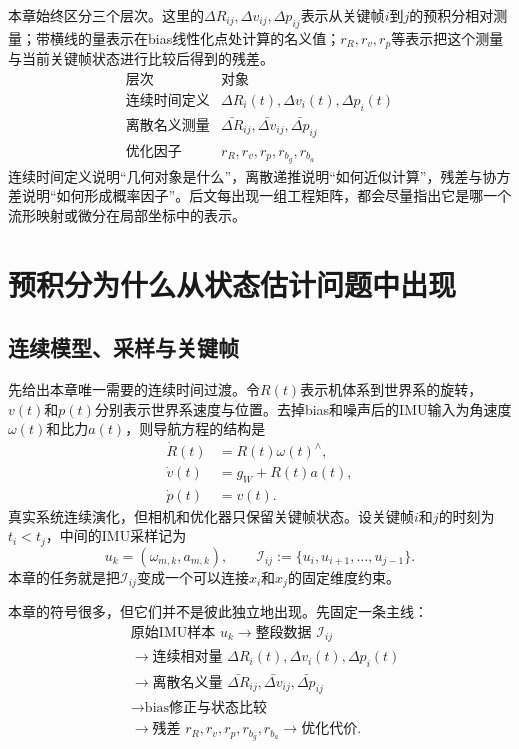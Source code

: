 本章始终区分三个层次。这里的$\Delta R_{ij},\Delta v_{ij},\Delta p_{ij}$表示从关键帧$i$到$j$的预积分相对测量；带横线的量表示在bias线性化点处计算的名义值；$r_R,r_v,r_p$等表示把这个测量与当前关键帧状态进行比较后得到的残差。
\[
\begin{array}{c|c}
\text{层次} & \text{对象}\\ \hline
\text{连续时间定义} & \Delta R_i(t),\Delta v_i(t),\Delta p_i(t)\\
\text{离散名义测量} & \bar{\Delta R}_{ij},\bar{\Delta v}_{ij},\bar{\Delta p}_{ij}\\
\text{优化因子} & r_R,r_v,r_p,r_{b_g},r_{b_a}
\end{array}
\]
连续时间定义说明“几何对象是什么”，离散递推说明“如何近似计算”，残差与协方差说明“如何形成概率因子”。后文每出现一组工程矩阵，都会尽量指出它是哪一个流形映射或微分在局部坐标中的表示。


\section{预积分为什么从状态估计问题中出现}

\subsection{连续模型、采样与关键帧}

先给出本章唯一需要的连续时间过渡。令$R(t)$表示机体系到世界系的旋转，$v(t)$和$p(t)$分别表示世界系速度与位置。去掉bias和噪声后的IMU输入为角速度$\omega(t)$和比力$a(t)$，则导航方程的结构是
\[
\boxed{
\begin{aligned}
    \dot R(t)&=R(t)\omega(t)^\wedge,\\
    \dot v(t)&=g_W+R(t)a(t),\\
    \dot p(t)&=v(t).
\end{aligned}
}
\]
真实系统连续演化，但相机和优化器只保留关键帧状态。设关键帧$i$和$j$的时刻为$t_i<t_j$，中间的IMU采样记为
\[
    u_k=(\omega_{m,k},a_{m,k}),
    \qquad
    \mathcal I_{ij}:=\{u_i,u_{i+1},\ldots,u_{j-1}\}.
\]
本章的任务就是把$\mathcal I_{ij}$变成一个可以连接$x_i$和$x_j$的固定维度约束。

本章的符号很多，但它们并不是彼此独立地出现。先固定一条主线：
\[
\boxed{
\begin{aligned}
&\text{原始IMU样本 }u_k
\longrightarrow
\text{整段数据 }\mathcal I_{ij}\\
&\longrightarrow
\text{连续相对量 }\Delta R_i(t),\Delta v_i(t),\Delta p_i(t)\\
&\longrightarrow
\text{离散名义量 }\bar{\Delta R}_{ij},
\bar{\Delta v}_{ij},
\bar{\Delta p}_{ij}\\
&\longrightarrow
\text{bias修正与状态比较}\\
&\longrightarrow
\text{残差 }r_R,r_v,r_p,r_{b_g},r_{b_a}
\longrightarrow
\text{优化代价}.
\end{aligned}
}
\]

